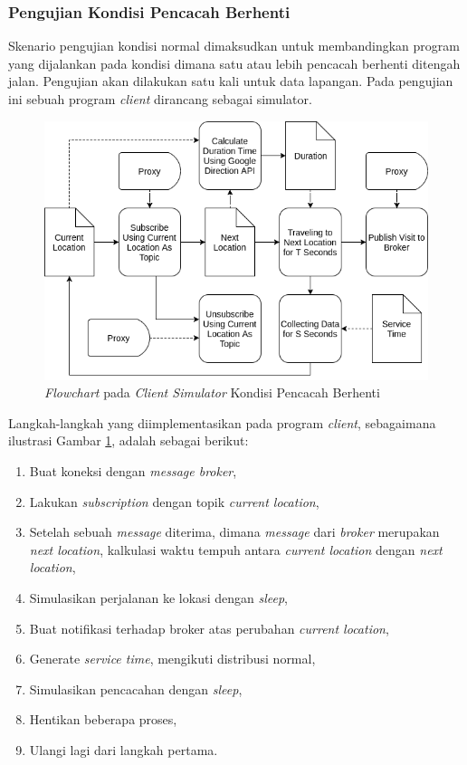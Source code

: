 \subsubsection{Pengujian Kondisi Pencacah Berhenti}
Skenario pengujian kondisi normal dimaksudkan untuk membandingkan program yang dijalankan pada kondisi dimana satu atau lebih pencacah berhenti ditengah jalan. Pengujian akan dilakukan satu kali untuk data lapangan. Pada pengujian ini sebuah program \textit{client} dirancang sebagai simulator.


\begin{figure}[!]
    \centering
    \includegraphics[width=\textwidth]{../../Resources/Images/client-algorithm-enumerator-quit-field}
    \caption{\textit{Flowchart} pada \textit{Client Simulator} Kondisi Pencacah Berhenti}
    \label{fig:client-algorithm-enumerator-quit-field}
\end{figure}


Langkah-langkah yang diimplementasikan pada program \textit{client}, sebagaimana ilustrasi Gambar \ref{fig:client-algorithm-enumerator-quit-field}, adalah sebagai berikut:

\begin{enumerate}
\item Buat koneksi dengan \textit{message broker}, 
\item Lakukan \textit{subscription} dengan topik \textit{current location}, 
\item Setelah sebuah \textit{message} diterima, dimana \textit{message} dari \textit{broker} merupakan \textit{next location}, kalkulasi waktu tempuh antara \textit{current location} dengan \textit{next location},
\item Simulasikan perjalanan ke lokasi dengan \textit{sleep},
\item Buat notifikasi terhadap broker atas perubahan \textit{current location}, 
\item Generate \textit{service time}, mengikuti distribusi normal, 
\item Simulasikan pencacahan dengan \textit{sleep}, 
\item Hentikan beberapa proses, 
\item Ulangi lagi dari langkah pertama.
\end{enumerate}


